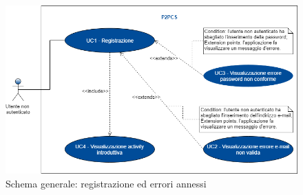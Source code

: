 \begin{figure}[h]
	\includegraphics[width=15cm]{res/images/Schemagenerale1.png}
	\centering
	\caption{Schema generale: registrazione ed errori annessi}
\end{figure}
